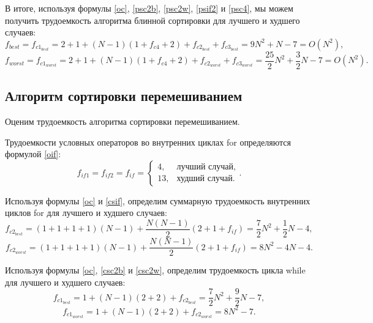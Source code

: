 В итоге, используя формулы \eqref{oc}, \eqref{psc2b}, \eqref{psc2w}, \eqref{psif2} и \eqref{psc4}, мы можем получить трудоемкость алгоритма блинной сортировки для лучшего и худшего случаев:
\begin{equation}\label{psb}
	f_{best} = f_{c1_{best}} = 2 + 1 + (N - 1)(1 + f_{c4} + 2) + f_{c2_{best}} + f_{c3_{best}} = 9N^2 + N - 7 = O(N^2),
\end{equation}
\begin{equation}\label{psw}
	f_{worst} = f_{c1_{worst}} = 2 + 1 + (N - 1)(1 + f_{c4} + 2) + f_{c2_{worst}} + f_{c3_{worst}} = \frac{25}{2}N^2 + \frac{3}{2}N - 7 = O(N^2).
\end{equation}

\subsection{Алгоритм сортировки перемешиванием}

Оценим трудоемкость алгоритма сортировки перемешиванием.

Трудоемкости условных операторов во внутренних циклах for определяются формулой \eqref{oif}:
\begin{equation}\label{csif}
	f_{if1} = f_{if2} = f_{if} =
	\begin{cases}
		4, &\text{лучший случай}, \\
		13, &\text{худший случай}.
	\end{cases}.
\end{equation}

Используя формулы \eqref{oc} и \eqref{csif}, определим суммарную трудоемкость внутренних циклов for для лучшего и худшего случаев:
\begin{equation}\label{csc2b}
	f_{c2_{best}} = (1 + 1 + 1 + 1)(N - 1) + \frac{N(N - 1)}{2}(2 + 1 + f_{if}) = \frac{7}{2}N^2 + \frac{1}{2}N - 4,
\end{equation}
\begin{equation}\label{csc2w}
	f_{c2_{worst}} = (1 + 1 + 1 + 1)(N - 1) + \frac{N(N - 1)}{2}(2 + 1 + f_{if}) = 8N^2 - 4N - 4.
\end{equation}

Используя формулы \eqref{oc}, \eqref{csc2b} и \eqref{csc2w}, определим трудоемкость цикла while для лучшего и худшего случаев:
\begin{equation}\label{csc1b}
	f_{c1_{best}} = 1 + (N - 1)(2 + 2) + f_{c2_{best}} = \frac{7}{2}N^2 + \frac{9}{2}N - 7,
\end{equation}
\begin{equation}\label{csc1w}
	f_{c1_{worst}} = 1 + (N - 1)(2 + 2) + f_{c2_{worst}} = 8N^2 - 7.
\end{equation}

